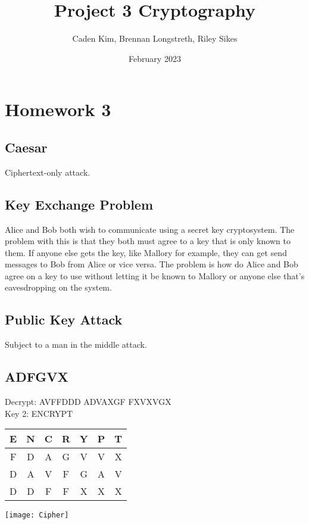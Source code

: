 \documentclass{article}
\title{Project 3 Cryptography}
\author{Caden Kim, Brennan Longstreth, Riley Sikes }
\date{February 2023}
\begin{document}
\maketitle

\section{Homework 3}

\subsection{Caesar}

Ciphertext-only attack.

\subsection{Key Exchange Problem}

Alice and Bob both wish to communicate using a secret key cryptosystem. The problem with this is that they both must agree to a key that is only known to them. If anyone else gets the key, like Mallory for example, they can get send messages to Bob from Alice or vice versa. The problem is how do Alice and Bob agree on a key to use without letting it be known to Mallory or anyone else that's eavesdropping on the system.

\subsection{Public Key Attack}

Subject to a man in the middle attack.

\subsection{ADFGVX}
Decrypt: AVFFDDD ADVAXGF FXVXVGX \\

Key 2: ENCRYPT \\
\begin{center}
\begin{tabular}{ c c c c c c c }
    E & N & C & R & Y & P & T \\ [0.5ex] 
    \hline
    F & D & A & G & V & V & X \\
    D & A & V & F & G & A & V \\
    D & D & F & F & X & X & X \\
\end{tabular}
\end{center}
\texttt{[image: Cipher]}\\
\end{document}
